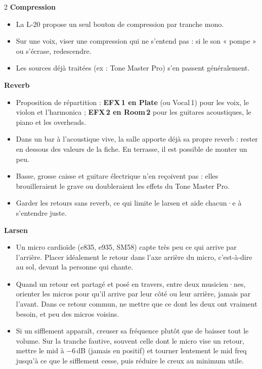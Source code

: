 \documentclass[9pt]{extarticle}
\begin{document}
\begin{multicols}{2}
\textbf{Compression}
\begin{itemize}
  \item La L-20 propose un seul bouton de compression par tranche mono.
  \item Sur une voix, viser une compression qui ne s'entend pas : si le son « pompe » ou s'écrase, redescendre.
  \item Les sources déjà traitées (ex : Tone Master Pro) s'en passent généralement.
\end{itemize}

\columnbreak

\textbf{Reverb}
\begin{itemize}
  \item Proposition de répartition : \textbf{EFX\,1 en Plate} (ou Vocal\,1) pour les voix, le violon et l'harmonica ; \textbf{EFX\,2 en Room\,2} pour les guitares acoustiques, le piano et les overheads.
  \item Dans un bar à l'acoustique vive, la salle apporte déjà sa propre reverb : rester en dessous des valeurs de la fiche. En terrasse, il est possible de monter un peu.
  \item Basse, grosse caisse et guitare électrique n'en reçoivent pas : elles brouilleraient le grave ou doubleraient les effets du Tone Master Pro.
  \item Garder les retours sans reverb, ce qui limite le larsen et aide chacun·e à s'entendre juste.
\end{itemize}

\textbf{Larsen}
\begin{itemize}
  \item Un micro cardioïde (e835, e935, SM58) capte très peu ce qui arrive par l'arrière. Placer idéalement le retour dans l'axe arrière du micro, c'est-à-dire au sol, devant la personne qui chante.
  \item Quand un retour est partagé et posé en travers, entre deux musicien·nes, orienter les micros pour qu'il arrive par leur côté ou leur arrière, jamais par l'avant. Dans ce retour commun, ne mettre que ce dont les deux ont vraiment besoin, et peu des micros voisins.
  \item Si un sifflement apparaît, creuser sa fréquence plutôt que de baisser tout le volume. Sur la tranche fautive, souvent celle dont le micro vise un retour, mettre le mid à −6\,dB (jamais en positif) et tourner lentement le mid freq jusqu'à ce que le sifflement cesse, puis réduire le creux au minimum utile.
\end{itemize}


\end{multicols}
\end{document}
